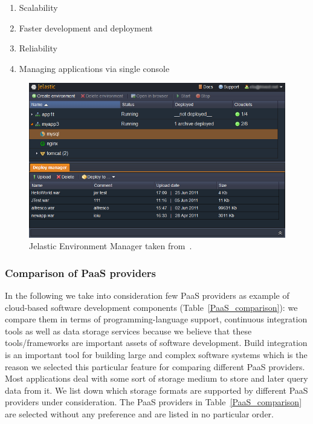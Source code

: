 \documentclass[11pt,fleqn,twoside]{article}
\begin{document}
\begin{enumerate}
	\item Scalability
	\item Faster development and deployment
	\item Reliability
	\item Managing applications via single console
\end{enumerate}	

\begin{figure}[h]
\begin{center}
\includegraphics[width=0.8\columnwidth]{fig/Jelastic}
\end{center}
\vspace*{-4ex}
\caption{Jelastic Environment Manager taken from~\cite{jelastic_manager_url}.}
\label{fig:Jelastic}
\end{figure}

\subsubsection{Comparison of PaaS providers}

In the following we take into consideration few PaaS providers as example of cloud-based software development components (Table~\ref{PaaS_comparison}): we compare them in terms of programming-language support, continuous integration tools as well as data storage services because we believe that these tools/frameworks are important assets of software development. Build integration is an important tool for building large and complex software systems which is the reason we selected this particular feature for comparing different PaaS providers. Most applications deal with some sort of storage medium to store and later query data from it. We list down which storage formats are supported by different PaaS providers under consideration. The PaaS providers in Table~\ref{PaaS_comparison} are selected without any preference and are listed in no particular order.
\end{document}
